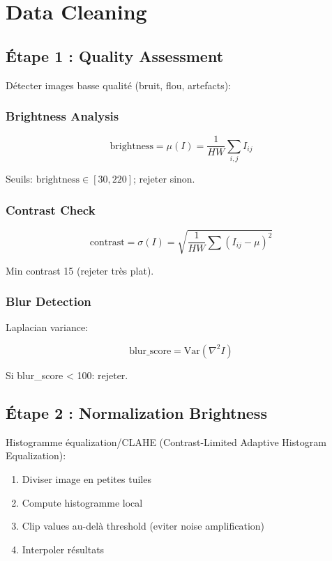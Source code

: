 \documentclass[12pt,a4paper,oneside]{report}
\begin{document}
\section{Data Cleaning}

\subsection{Étape 1 : Quality Assessment}

Détecter images basse qualité (bruit, flou, artefacts):

\subsubsection{Brightness Analysis}

\begin{equation}
\text{brightness} = \mu(I) = \frac{1}{HW} \sum_{i,j} I_{ij}
\end{equation}

Seuils: $\text{brightness} \in [30, 220]$; rejeter sinon.

\subsubsection{Contrast Check}

\begin{equation}
\text{contrast} = \sigma(I) = \sqrt{\frac{1}{HW} \sum (I_{ij} - \mu)^2}
\end{equation}

Min contrast 15 (rejeter très plat).

\subsubsection{Blur Detection}

Laplacian variance:

\begin{equation}
\text{blur\_score} = \text{Var}(\nabla^2 I)
\end{equation}

Si blur\_score < 100: rejeter.

\subsection{Étape 2 : Normalization Brightness}

Histogramme équalization/CLAHE (Contrast-Limited Adaptive Histogram 
Equalization):

\begin{enumerate}
    \item Diviser image en petites tuiles
    \item Compute histogramme local
    \item Clip values au-delà threshold (eviter noise amplification)
    \item Interpoler résultats
\end{enumerate}
\end{document}
